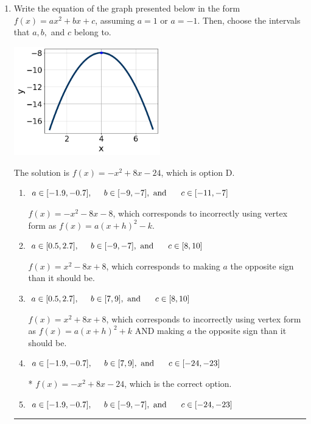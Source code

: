 \documentclass{extbook}[14pt]
\newcommand{\litem}[1]{\item #1

\rule{\textwidth}{0.4pt}}
\begin{document}
\begin{enumerate}\litem{
Write the equation of the graph presented below in the form $f(x)=ax^2+bx+c$, assuming  $a=1$ or $a=-1$. Then, choose the intervals that $a, b,$ and $c$ belong to.

\begin{center}
    \includegraphics[width=0.5\textwidth]{../Figures/quadraticGraphToEquationB.png}
\end{center}




The solution is \( f(x) = -x^{2} +8 x -24 \), which is option D.\begin{enumerate}[label=\Alph*.]
\item \( a \in [-1.9, -0.7], \hspace*{5mm} b \in [-9, -7], \text{ and } \hspace*{5mm} c \in [-11, -7] \)

$f(x)=-x^{2} -8 x -8$, which corresponds to incorrectly using vertex form as $f(x) = a(x+h)^2 - k$.
\item \( a \in [0.5, 2.7], \hspace*{5mm} b \in [-9, -7], \text{ and } \hspace*{5mm} c \in [8, 10] \)

$f(x)=x^{2} -8 x + 8$, which corresponds to making $a$ the opposite sign than it should be.
\item \( a \in [0.5, 2.7], \hspace*{5mm} b \in [7, 9], \text{ and } \hspace*{5mm} c \in [8, 10] \)

$f(x)=x^{2} +8 x + 8$, which corresponds to incorrectly using vertex form as $f(x) = a(x+h)^2+k$ AND making $a$ the opposite sign than it should be.
\item \( a \in [-1.9, -0.7], \hspace*{5mm} b \in [7, 9], \text{ and } \hspace*{5mm} c \in [-24, -23] \)

* $f(x)=-x^{2} +8 x -24$, which is the correct option.
\item \( a \in [-1.9, -0.7], \hspace*{5mm} b \in [-9, -7], \text{ and } \hspace*{5mm} c \in [-24, -23] \)


\end{enumerate}}
\end{enumerate}
\end{document}

